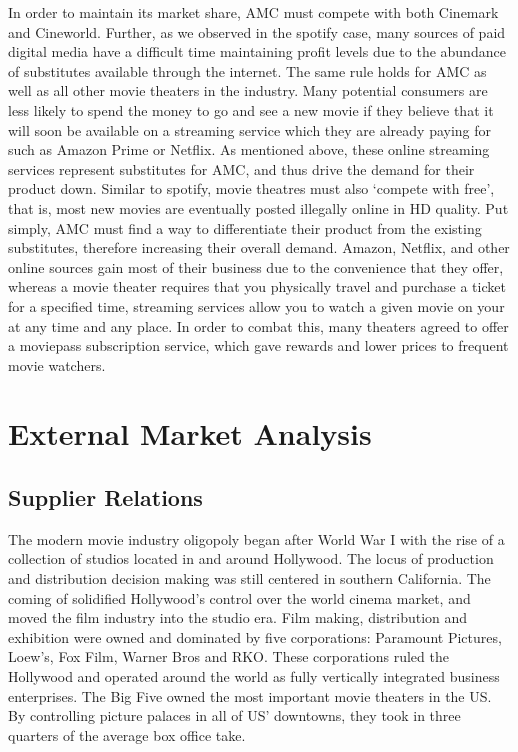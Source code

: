 \documentclass[12pt]{article}
\begin{document}
In order to maintain its market share, AMC must compete with both Cinemark and Cineworld. Further, as we observed in the spotify case, many sources of paid digital media have a difficult time maintaining profit levels due to the abundance of substitutes available through the internet. The same rule holds for AMC as well as all other movie theaters in the industry. Many potential consumers are less likely to spend the money to go and see a new movie if they believe that it will soon be available on a streaming service which they are already paying for such as Amazon Prime or Netflix. As mentioned above, these online streaming services represent substitutes for AMC, and thus drive the demand for their product down. Similar to spotify, movie theatres must also ‘compete with free’, that is, most new movies are eventually posted illegally online in HD quality. Put simply, AMC must find a way to differentiate their product from the existing substitutes, therefore increasing their overall demand. Amazon, Netflix, and other online sources gain most of their business due to the convenience that they offer, whereas a movie theater requires that you physically travel and purchase a ticket for a specified time, streaming services allow you to watch a given movie on your at any time and any place. In order to combat this, many theaters agreed to offer a moviepass subscription service, which gave rewards and lower prices to frequent movie watchers. 


\section{External Market Analysis}


\subsection{Supplier Relations}
The modern movie industry oligopoly began after World War I with the rise of a collection of studios located in and around Hollywood. The locus of production and distribution decision making was still centered in southern California. The coming of solidified Hollywood’s control over the world cinema market, and moved the film industry into the studio era. Film making, distribution and exhibition were owned and dominated by five corporations: Paramount Pictures, Loew’s, Fox Film, Warner Bros and RKO. These corporations ruled the Hollywood and operated around the world as fully vertically integrated business enterprises. The Big Five owned the most important movie theaters in the US. By controlling picture palaces in all of US’ downtowns, they took in three quarters of the average box office take.
\end{document}
